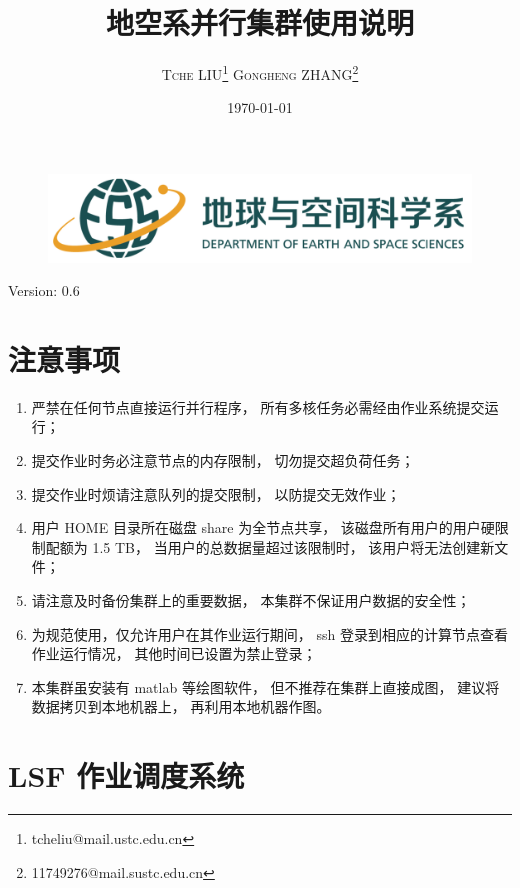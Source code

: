 \documentclass[UTF8]{ctexart}
\title{\vspace{10mm}\heiti\huge 地空系并行集群使用说明\vspace{30mm}}
\author{\LARGE\textsc{Tche LIU}\thanks{tcheliu@mail.ustc.edu.cn}\hspace{10mm}
\textsc{Gongheng ZHANG}\thanks{11749276@mail.sustc.edu.cn}
\vspace{10mm}}
\date{\today}
\begin{document}
\begin{figure}[t]
  \centering
  \includegraphics[width=125mm]{material/esslogo.png}
\end{figure}
\maketitle
\centerline{Version: 0.6}
\newpage

\tableofcontents
\newpage

\section{注意事项}
\begin{enumerate}[\hspace{15mm}（1）]
  \item 严禁在任何节点直接运行并行程序，
    所有多核任务必需经由作业系统提交运行；
  \item 提交作业时务必注意节点的内存限制，
    切勿提交超负荷任务；
  \item 提交作业时烦请注意队列的提交限制，
    以防提交无效作业；
  \item 用户 HOME 目录所在磁盘 share 为全节点共享，
    该磁盘所有用户的用户硬限制配额为 1.5 TB，
    当用户的总数据量超过该限制时，
    该用户将无法创建新文件；
  \item 请注意及时备份集群上的重要数据，
    本集群不保证用户数据的安全性；
  \item 为规范使用，仅允许用户在其作业运行期间，
    ssh 登录到相应的计算节点查看作业运行情况，
    其他时间已设置为禁止登录；
  \item 本集群虽安装有 matlab 等绘图软件，
    但不推荐在集群上直接成图，
    建议将数据拷贝到本地机器上，
    再利用本地机器作图。
\end{enumerate}

\section{LSF 作业调度系统}
\end{document}
